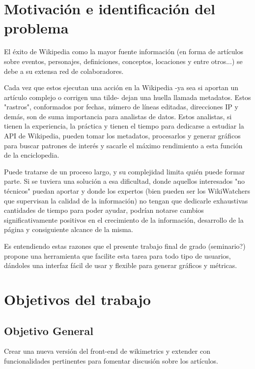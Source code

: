 


\section{Motivación e identificación del problema}

El éxito de Wikipedia como la mayor fuente información (en forma de artículos sobre eventos, personajes, definiciones, conceptos, locaciones y entre otros...) se debe a su extensa red de colaboradores.

Cada vez que estos ejecutan una acción en la Wikipedia -ya sea si aportan un artículo complejo o corrigen una tilde- dejan una huella llamada metadatos. Estos "rastros", conformados por fechas, número de líneas editadas, direcciones IP y demás, son de suma importancia para analistas de datos. Estos analistas, si tienen la experiencia, la práctica y tienen el tiempo para dedicarse a estudiar la API de Wikipedia, pueden tomar los metadatos, procesarlos y generar gráficos para buscar patrones de interés y sacarle el máximo rendimiento a esta función de la enciclopedia.

Puede tratarse de un proceso largo, y su complejidad limita quién puede formar parte. Si se tuviera una solución a esa dificultad, donde aquellos interesados "no técnicos" puedan aportar y donde los expertos (bien pueden ser los WikiWatchers que supervisan la calidad de la información) no tengan que dedicarle exhaustivas cantidades de tiempo para poder ayudar, podrían notarse cambios significativamente positivos en el crecimiento de la información, desarrollo de la página y consiguiente alcance de la misma.

Es entendiendo estas razones que el presente trabajo final de grado (seminario?) propone una herramienta que facilite esta tarea para todo tipo de usuarios, dándoles una interfaz fácil de usar y flexible para generar gráficos y métricas.

\section{Objetivos del trabajo}

\subsection{Objetivo General}
Crear una nueva versión del front-end de wikimetrics y extender con funcionalidades pertinentes para fomentar discusión sobre los artículos.

